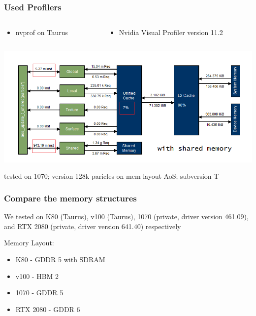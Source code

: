 \documentclass[aspectratio=169]{beamer}
\begin{document}
\begin{frame}
	\frametitle{Used Profilers}
	\begin{columns}
	\begin{column}{0.3\textwidth}
		\begin{itemize}
			\small \item nvprof on Taurus
		\end{itemize}
	\end{column}
	
	\begin{column}{0.5\textwidth}
		\begin{itemize}
			\small \item Nvidia Visual Profiler version 11.2
		\end{itemize}
	\end{column}
	\end{columns}
	\smallskip
	\includegraphics[scale=0.50]{resources/128-1070-aos-update-t-shared.png}
	
	\smallskip
	\small tested on 1070; version 128k paricles on mem layout AoS; subversion T
\end{frame}

\begin{frame}
	\frametitle{Compare the memory structures}
	We tested on K80 (Taurus), v100 (Taurus), 1070 (private, driver version 461.09), and RTX 2080 (private, driver version 641.40) respectively
	
	\medskip
	Memory Layout:
	\begin{itemize}
		\item K80 - GDDR 5 with SDRAM
		\item v100 - HBM 2
		\item 1070 - GDDR 5
		\item RTX 2080 - GDDR 6
	\end{itemize}
\end{frame}
\end{document}

